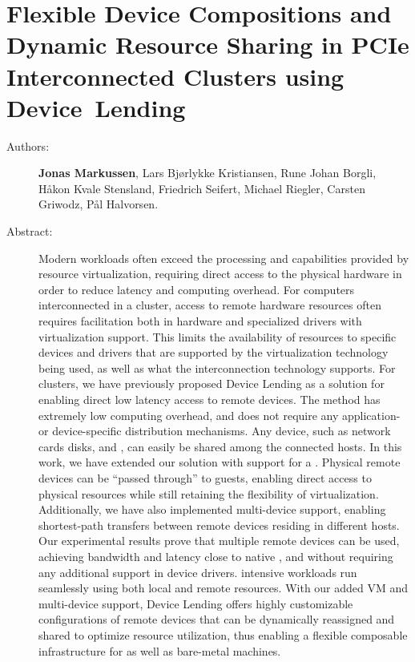\chapter{Flexible Device Compositions and Dynamic Resource Sharing in PCIe Interconnected Clusters using Device~Lending}
\label{paper:cc}
\paperthumb

\begin{description}
	\item[Authors:]
		\textbf{Jonas Markussen}, Lars Bj{\o}rlykke Kristiansen, Rune Johan Borgli, H{\aa}kon Kvale Stensland,
		Friedrich Seifert, Michael Riegler, Carsten Griwodz, P{\aa}l Halvorsen.

	\item[Abstract:]
		Modern workloads often exceed the processing and  capabilities provided by resource virtualization,
		requiring direct access to the physical hardware in order to reduce latency and computing overhead.
		For computers interconnected in a cluster, access to remote hardware resources often requires facilitation
		both in hardware and specialized drivers with virtualization support. This limits the availability of
		resources to specific devices and drivers that are supported by the virtualization technology being used, as
		well as what the interconnection technology supports.
		For  clusters, we have previously proposed Device Lending as a solution for enabling direct
		low latency access to remote devices.
		The method has extremely low computing overhead, and does not
		require any application- or device-specific distribution mechanisms. Any  device, such as network cards disks, and
		, can easily be shared among the connected hosts.
		In this work, we have extended our solution with support for a  .
		Physical remote devices can be  ``passed through'' to  guests, enabling direct access to physical resources 
		while still retaining the flexibility of virtualization. Additionally, we have also implemented multi-device
		support, enabling shortest-path  transfers between remote devices residing in different hosts.
		Our experimental results prove that multiple remote devices can be used, achieving bandwidth and latency
		close to native , and without requiring any additional support in device drivers. 
		 intensive workloads run seamlessly using both local and remote resources.
		With our added VM and multi-device support, Device Lending offers highly customizable 
		configurations of remote devices that can be dynamically reassigned and shared to optimize resource 
		utilization, thus enabling a flexible composable  infrastructure for  as well as bare-metal
		machines.


\end{description}
